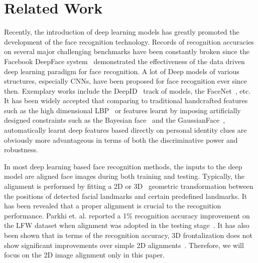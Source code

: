 \documentclass[10pt,twocolumn,letterpaper]{article}
\begin{document}

\section{Related Work}

Recently, the introduction of deep learning models has greatly promoted the development of the face recognition technology. 
Records of recognition accuracies on several major challenging benchmarks have been constantly broken since the Facebook DeepFace system~\cite{taigman2014deepface} demonstrated the effectiveness of the data driven deep learning paradigm for face recognition. 
A lot of Deep models of various structures, especially CNNs, have been proposed for face recognition ever since then. 
Exemplary works include the DeepID~\cite{sun2014deep,sun2015deeply,sun2015deepid3} track of models, the FaceNet~\cite{schroff2015facenet}, etc. 
It has been widely accepted that comparing to traditional handcrafted features such as the high dimensional LBP~\cite{chen2013blessing} or features learnt by imposing artificially designed constraints such as the Bayesian face~\cite{chen2012bayesian} and the GaussianFace~\cite{lu2014surpassing}, automatically learnt deep features 	 based directly on personal identity clues are obviously more advantageous in terms of both the discriminative power and robustness. 

In most deep learning based face recognition methods, the inputs to the deep model are aligned face images during both training and testing. 
Typically, the alignment is performed by fitting a 2D or 3D~\cite{hu2016face,taigman2014deepface} geometric transformation between the positions of detected facial landmarks and certain predefined landmarks. 
It has been revealed that a proper alignment is crucial to the recognition performance. 
Parkhi et. al. reported a 1\% recognition accuracy improvement on the LFW dataset when alignment was adopted in the testing stage~\cite{parkhi2015deep}. 
It has also been shown that in terms of the recognition accuracy, 3D frontalization does not show significant improvements over simple 2D alignments~\cite{banerjee2016frontalize}. 
Therefore, we will focus on the 2D image alignment only in this paper.
\end{document}
